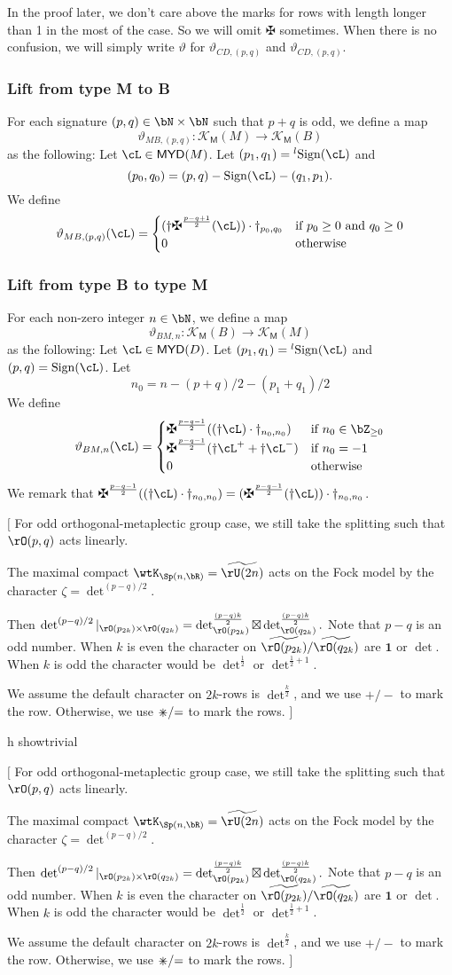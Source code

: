 \documentclass[12pt,a4paper]{amsart}
\newcommand{\trivial}[2][]{\if\relax\detokenize{#1}\relax
  {%
      \color{orange} \vspace{0em} $[$  #2 $]$
      \color{black}
  }
  \else
\ifx#1h
\ifcsname showtrivial\endcsname
{%
    \color{orange} \vspace{0em}  $[$ #2 $]$
    \color{black}
}
\fi
\else {\red Wrong argument!} \fi
\fi
}
\def\MYD{{\mathsf{MYD}}}
\def\KM{{\mathcal{K_{\mathsf{M}}}}}
\newcommand{\bfone}{\mathbf{1}}
\numberwithin{equation}{section}
\theoremstyle{remark}
\def\half{{\tfrac{1}{2}}}
\def\lsign{{}^l\mathrm{Sign}}
\def\ssign{\mathrm{Sign}}
\def\umm{{=}}
\def\upp{{\ast}}
\def\upp{
  {{\setbox0\hbox{$\times$}
      \rlap{\hbox to \wd0{\hss$+$\hss}}\box0
    }}
}
\begin{document}
{
  \color{red}
  In the proof later, we don't care above the marks for rows with length longer
  than 1 in the most of the case. So we will omit $\maltese$ sometimes.
  When there is no confusion, we will simply write $\vartheta$ for
  $\vartheta_{CD,(p,q)}$ and $\vartheta_{CD,(p,q)}$.
}


\subsubsection{Lift from type M to B}

For each signature $(p,q)\in \bN\times \bN$ such that $p+q$ is odd, we define a map
\[
  \vartheta_{MB,(p,q)} \colon \KM(M)\rightarrow \KM(B)
\]
as the following:
Let $\cL\in \MYD(M)$. Let $(p_{1},q_{1})=\lsign(\cL)$ and
\[
(p_{0}, q_{0})  = (p,q) -\ssign(\cL)-(q_{1},p_{1}).
\]
We define
\[
  \vartheta_{MB,(p,q)}(\cL) =
  \begin{cases}
    (\dagger \maltese^{\frac{p-q+1}{2}}(\cL))\cdot \dagger_{p_{0}, q_{0}} &
    \text{if } p_{0}\geq 0 \text{ and } q_{0} \geq 0\\
    0 & \text{otherwise}
  \end{cases}
\]


\subsubsection{Lift from type B to type M}

For each non-zero integer $n\in \bN$, we define a map
\[
  \vartheta_{BM,n} \colon \KM(B)\rightarrow \KM(M)
\]
as the following:
Let $\cL\in \MYD(D)$. Let $(p_{1},q_{1})=\lsign(\cL)$ and
$(p,q) = \ssign(\cL)$.
Let
\[
  n_{0} = n - (p+q)/2 - (p_{1}+q_{1})/2
\]
We define
\[
  \vartheta_{BM,n}(\cL) =
  \begin{cases}
    \maltese^{\frac{p-q-1}{2}}((\dagger \cL)\cdot \dagger_{n_{0}, n_{0}}) &
    \text{if } n_{0}\in \bZ_{\geq 0}\\
    \maltese^{\frac{p-q-1}{2}}(\dagger \cL^{+}  + \dagger \cL^{-})& \text{if } n_{0}=-1\\
    0&\text{otherwise}
  \end{cases}
\]
We remark that
$\maltese^{\frac{p-q-1}{2}}((\dagger \cL)\cdot \dagger_{n_{0}, n_{0}})= (\maltese^{\frac{p-q-1}{2}}(\dagger\cL))\cdot \dagger_{n_{0},n_{0}}$.

\trivial{
  For odd orthogonal-metaplectic group case, we still take the splitting such
  that $\rO(p,q)$ acts linearly.

  The maximal compact $\wtK_{\Sp(n,\bR)}= \widetilde{\rU(2n)}$ acts on the Fock model by the
  character $\zeta=\det^{(p-q)/2}$.

  Then
  $\det^{(p-q)/2}|_{\rO(p_{2k})\times \rO(q_{2k})}=\det^{\frac{(p-q)k}{2}}_{\rO(p_{2k})}\boxtimes
  \det^{\frac{(p-q)k}{2}}_{\rO(q_{2k})}. $
  Note that $p-q$ is an odd number.
  When $k$ is even the character on $\widetilde{\rO(p_{2k})}/\widetilde{\rO(q_{2k})}$ are
  $\bfone$ or $\det$. When $k$ is odd the character would be $\det^{\half}$ or
  $\det^{\half+1}$.

  We assume the default character on $2k$-rows is $\det^{\frac{k}{2}}$, and
  we use $+/-$ to mark the row. Otherwise, we use $\upp/\umm$ to mark the rows.
}
\end{document}
